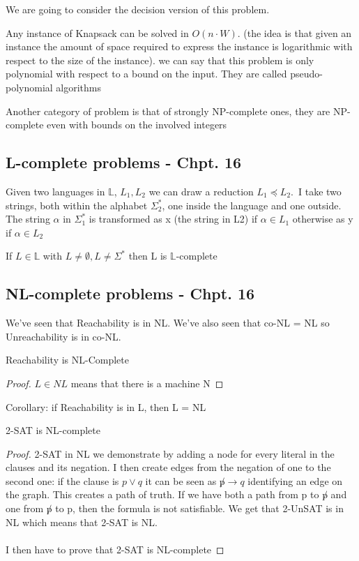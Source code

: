 \begin{proposition}
    We are going to consider the decision version of this problem.
\end{proposition}
\begin{theorem}[9.4]
    Any instance of Knapsack can be solved in $O(n\cdot W)$. (the idea is that given an instance the amount of space required to express the instance is logarithmic with respect to the size of the instance). we can say that this problem is only polynomial with respect to a bound on the input. They are called pseudo-polynomial algorithms
\end{theorem}
Another category of problem is that of strongly NP-complete ones, they are NP-complete even with bounds on the involved integers

\subsection{L-complete problems - Chpt. 16}
Given two languages in $\mathbb{L}$, $L_1, L_2$ we can draw a reduction $L_1 \preceq L_2$.\
I take two strings, both within the alphabet $\Sigma_2^*$, one inside the language and one outside. The string $\alpha$ in $\Sigma_1^*$ is transformed as x (the string in L2) if $\alpha \in L_1$ otherwise as y if $\alpha \in L_2$
\begin{theorem}
    If $L \in \mathbb{L}$ with $L\neq \emptyset, L \neq \Sigma^*$ then L is $\mathbb{L}$-complete
\end{theorem}
\subsection{NL-complete problems - Chpt. 16}
We've seen that Reachability is in NL. We've also seen that co-NL = NL so Unreachability is in co-NL.
\begin{theorem}
    Reachability is NL-Complete
    \begin{proof}
        $L \in NL$ means that there is a machine N 
    \end{proof}
\end{theorem}
Corollary: if Reachability is in L, then L = NL

\begin{theorem}
    2-SAT is NL-complete
    \begin{proof}
        2-SAT in NL we demonstrate by adding a node for every literal in the clauses and its negation. I then create edges from the negation of one to the second one: if the clause is $p \vee q$ it can be seen as $\not p \rightarrow q$ identifying an edge on the graph. This creates a path of truth. If we have both a path from p to $\not p$ and one from $\not p$ to p, then the formula is not satisfiable. We get that 2-UnSAT is in NL which means that 2-SAT is NL.\\\\
        I then have to prove that 2-SAT is NL-complete
    \end{proof}
\end{theorem}

